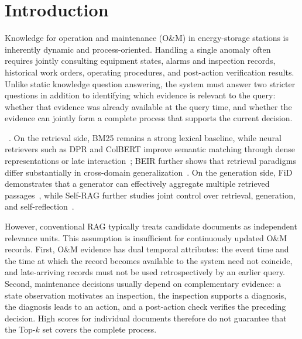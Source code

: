 \section{Introduction}
\label{sec:introduction}

Knowledge for operation and maintenance (O\&M) in energy-storage stations is inherently dynamic and process-oriented. Handling a single anomaly often requires jointly consulting equipment states, alarms and inspection records, historical work orders, operating procedures, and post-action verification results. Unlike static knowledge question answering, the system must answer two stricter questions in addition to identifying which evidence is relevant to the query: whether that evidence was already available at the query time, and whether the evidence can jointly form a complete process that supports the current decision.

~\cite{lewis2020rag}. On the retrieval side, BM25 remains a strong lexical baseline, while neural retrievers such as DPR and ColBERT improve semantic matching through dense representations or late interaction~\cite{karpukhin2020dpr,khattab2020colbert}; BEIR further shows that retrieval paradigms differ substantially in cross-domain generalization~\cite{thakur2021beir}. On the generation side, FiD demonstrates that a generator can effectively aggregate multiple retrieved passages~\cite{izacard2021fid}, while Self-RAG further studies joint control over retrieval, generation, and self-reflection~\cite{asai2024selfrag}.

However, conventional RAG typically treats candidate documents as independent relevance units. This assumption is insufficient for continuously updated O\&M records. First, O\&M evidence has dual temporal attributes: the event time and the time at which the record becomes available to the system need not coincide, and late-arriving records must not be used retrospectively by an earlier query. Second, maintenance decisions usually depend on complementary evidence: a state observation motivates an inspection, the inspection supports a diagnosis, the diagnosis leads to an action, and a post-action check verifies the preceding decision. High scores for individual documents therefore do not guarantee that the Top-$k$ set covers the complete process.

